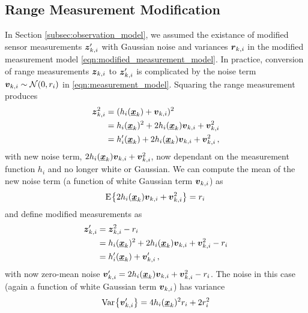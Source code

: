 \documentclass[twocolumn]{autart}
\begin{document}
\subsection{Range Measurement Modification} \label{subsec:range_measurement_mod}
In Section \ref{subsec:observation_model}, we assumed the existance of modified sensor measurements ${\boldsymbol{z}}'_{k,i}$ with Gaussian noise and variances ${\boldsymbol{r}}_{k,i}$ in the modified measurement model \eqref{eqn:modified_measurement_model}. In practice, conversion of range measurements ${\boldsymbol{z}}_{k,i}$ to ${\boldsymbol{z}}'_{k,i}$ is complicated by the noise term ${\boldsymbol{v}}_{k,i} \sim \mathcal{N}(0, r_i)$ in \eqref{eqn:measurement_model}. Squaring the range measurement produces
\begin{equation}
    \begin{split}
        {\boldsymbol{z}}_{k,i}^2 &= (h_i({\boldsymbol{\underline{x}}}_k) + {\boldsymbol{v}}_{k,i})^2 \\
        &= h_i({\boldsymbol{\underline{x}}}_k)^2 + 2h_i({\boldsymbol{\underline{x}}}_k){\boldsymbol{v}}_{k,i} + {\boldsymbol{v}}_{k,i}^2 \\
        &= h'_i({\boldsymbol{\underline{x}}}_k) + 2h_i({\boldsymbol{\underline{x}}}_k){\boldsymbol{v}}_{k,i} + {\boldsymbol{v}}_{k,i}^2\,,
    \end{split}
\end{equation}
with new noise term, $2h_i({\boldsymbol{\underline{x}}}_k){\boldsymbol{v}}_{k,i} + {\boldsymbol{v}}_{k,i}^2$, now dependant on the measurement function $h_i$ and no longer white or Gaussian. We can compute the mean of the new noise term (a function of white Gaussian term ${\boldsymbol{v}}_{k,i}$) as
\begin{equation}
    \E{2h_i(\rvec{x}_k)\rv{v}_{k,i} + \rv{v}_{k,i}^2} = r_i\, \label{eqn:modified_noise_mean}
\end{equation}
and define modified measurements as
\begin{equation} \label{eqn:modified_measurement}
    \begin{split}
        {\boldsymbol{z}}'_{k,i} &= {\boldsymbol{z}}_{k,i}^2 - r_i \\
        &= h_i({\boldsymbol{\underline{x}}}_k)^2 + 2h_i({\boldsymbol{\underline{x}}}_k){\boldsymbol{v}}_{k,i} + {\boldsymbol{v}}_{k,i}^2 - r_i \\
        &= h'_i({\boldsymbol{\underline{x}}}_k) + {\boldsymbol{v}}'_{k,i}\,,
    \end{split}
\end{equation}
with now zero-mean noise ${\boldsymbol{v}}'_{k,i} = 2h_i({\boldsymbol{\underline{x}}}_k){\boldsymbol{v}}_{k,i} + {\boldsymbol{v}}_{k,i}^2 - r_i$. The noise in this case (again a function of white Gaussian term ${\boldsymbol{v}}_{k,i}$) has variance 
\begin{equation}
    \Var{\rv{v}'_{k,i}} = 4h_i(\rvec{x}_k)^2r_i + 2r_i^2
\end{equation}
\end{document}
